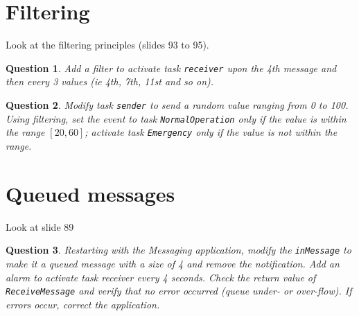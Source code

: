 \documentclass[11pt]{article}
\newtheorem{ex}{Question}
\begin{document}
\section{Filtering}

Look at the filtering principles (slides 93 to 95).

\begin{ex}
Add a filter to activate task \texttt{receiver} upon the 4th message and then every 3 values (ie 4th, 7th, 11st and so on).
\end{ex}
\begin{ex}
Modify task \texttt{sender} to send a random value ranging from 0 to 100. Using filtering, set the event to task \texttt{NormalOperation} only if the value is within the range $[20,60]$; activate task \texttt{Emergency} only if the value is not within the range.
\end{ex}

\section{Queued messages}

Look at slide 89

\begin{ex}Restarting with the Messaging application, modify the \texttt{inMessage} to make it a queued message with a size of 4 and remove the notification. Add an alarm to activate task receiver every 4 seconds. Check the return value of \texttt{ReceiveMessage} and verify that no error occurred (queue under- or over-flow). If errors occur, correct the application.
\end{ex}
\end{document}

